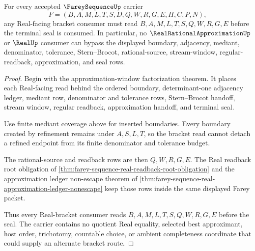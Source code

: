 \begin{theorem}
\label{thm:farey-sequence-real-bracket-consumer-lock}
For every accepted $\FareySequenceUp$ carrier
$$
F=(B,A,M,L,T,S,D,Q,W,R,G,E,H,C,P,N),
$$
any Real-facing bracket consumer must read $B,A,M,L,T,S,Q,W,R,G,E$ before the terminal seal is consumed. In particular, no $\RealRationalApproximationUp$ or $\RealUp$ consumer can bypass the displayed boundary, adjacency, mediant, denominator, tolerance, Stern--Brocot, rational-source, stream-window, regular-readback, approximation, and seal rows.
\end{theorem}
\begin{proof}
Begin with the approximation-window factorization theorem. It places each Real-facing read behind the ordered boundary, determinant-one adjacency ledger, mediant row, denominator and tolerance rows, Stern--Brocot handoff, stream window, regular readback, approximation handoff, and terminal seal.

Use finite mediant coverage above for inserted boundaries. Every boundary created by refinement remains under $A,S,L,T$, so the bracket read cannot detach a refined endpoint from its finite denominator and tolerance budget.

The rational-source and readback rows are then $Q,W,R,G,E$. The Real readback root obligation of \autoref{thm:farey-sequence-real-readback-root-obligation} and the approximation ledger non-escape theorem of \autoref{thm:farey-sequence-real-approximation-ledger-nonescape} keep those rows inside the same displayed Farey packet.

Thus every Real-bracket consumer reads $B,A,M,L,T,S,Q,W,R,G,E$ before the seal. The carrier contains no quotient Real equality, selected best approximant, host order, trichotomy, countable choice, or ambient completeness coordinate that could supply an alternate bracket route.
\end{proof}
